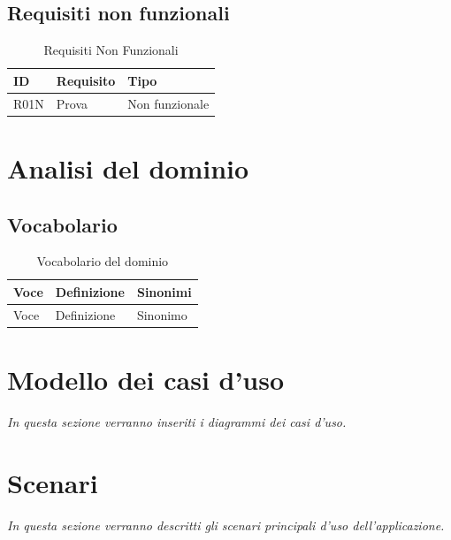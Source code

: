 \documentclass[12pt,a4paper]{report}
\begin{document}
\subsection{Requisiti non funzionali}
\begin{table}[H]
    \centering
    \begin{tabularx}{\textwidth}{|l|X|l|}
        \hline
        \textbf{ID} & \textbf{Requisito} & \textbf{Tipo} \\ \hline
        R01N & Prova & Non funzionale \\ \hline
    \end{tabularx}
    \caption{Requisiti Non Funzionali}
\end{table}

\section{Analisi del dominio}

\subsection{Vocabolario}
\begin{table}[H]
    \centering
    \begin{tabularx}{\textwidth}{|l|X|l|}
        \hline
        \textbf{Voce} & \textbf{Definizione} & \textbf{Sinonimi} \\ \hline
        Voce & Definizione & Sinonimo \\ \hline
    \end{tabularx}
    \caption{Vocabolario del dominio}
\end{table}

\section{Modello dei casi d'uso}
\textit{In questa sezione verranno inseriti i diagrammi dei casi d'uso.}

\section{Scenari}
\textit{In questa sezione verranno descritti gli scenari principali d'uso dell'applicazione.}
\end{document}
